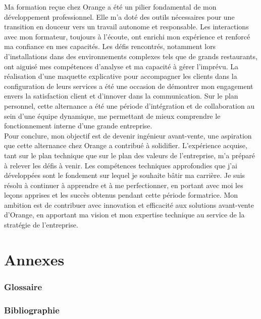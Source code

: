 \documentclass[12pt, a4paper]{article}
\begin{document}
Ma formation reçue chez Orange a été un pilier fondamental de mon
développement professionnel. Elle m'a doté des outils nécessaires
pour une transition en douceur vers un travail autonome et responsable.
Les interactions avec mon formateur, toujours à l'écoute, ont enrichi
mon expérience et renforcé ma confiance en mes capacités. Les défis
rencontrés, notamment lors d'installations 
dans des environnements complexes tels que de grands restaurants,
ont aiguisé mes compétences d'analyse et ma capacité à gérer l'imprévu.
La réalisation d'une maquette explicative pour accompagner les clients
dans la configuration de leurs services a été une occasion de démontrer
mon engagement envers la satisfaction client et d'innover dans la
communication. Sur le plan personnel, cette alternance a
été une période d'intégration et de collaboration au sein d'une équipe
dynamique, me permettant de mieux comprendre le fonctionnement interne
d'une grande entreprise.\\

Pour conclure, mon objectif est de devenir ingénieur avant-vente,
une aspiration que cette alternance chez Orange a contribué à solidifier.
L'expérience acquise, tant sur le plan technique que sur le plan des valeurs
de l'entreprise, m'a préparé à relever les défis à venir. Les compétences
techniques approfondies que j'ai développées sont le fondement sur lequel
je souhaite bâtir ma carrière. Je suis résolu à continuer à apprendre et à
me perfectionner, en portant avec moi les leçons apprises et les succès
obtenus pendant cette période formatrice. Mon ambition est de contribuer
avec innovation et efficacité aux solutions avant-vente d'Orange, en
apportant ma vision et mon expertise technique au service de la stratégie
de l'entreprise.
\newpage
\pagestyle{empty}
\appendix
\part{\Large{Annexes}}
\newpage
\parttoc 


\newpage
\pagestyle{fancy}
\glsaddall

\section{Glossaire}
\begingroup
\renewcommand{\addcontentsline}[3]{}
\printglossary[type=\acronymtype, title=Acronymes]
\endgroup

\newpage
\section{Bibliographie}


\end{document}
